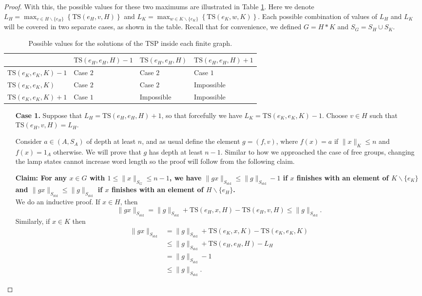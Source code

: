\documentclass[reqno,oneside]{amsart}
\newcommand{\std}{S_{\mathrm{std}}}
\newcommand{\TS}[3]{\mathrm{TS}\left(#1,#2,#3\right)}
\theoremstyle{plain}
\theoremstyle{definition}
\begin{document}
\begin{proof}
	With this, the possible values for these two maximums are illustrated in Table \ref{table: possible values TS free products}. Here we denote $L_H= \max_{v\in H\backslash\{e_H\}}\left\{\TS{e_H}{v}{H}\right\}$ and $L_K= \max_{w\in K\backslash\{e_K\}}\left\{\TS{e_K}{w}{K}\right\}$. Each possible combination of values of $L_H$ and $L_K$ will be covered in two separate cases, as shown in the table. Recall that for convenience, we defined $G=H*K$ and $S_G=S_H\cup S_K.$
	\begin{table}[h!]
		\centering
		\begin{tabular}{|l|l|l|l|}
			\hline
			\diagbox[width=3.5cm]{$L_K$}{$L_H$}& $\TS{e_H}{e_H}{H}-1$ & $\TS{e_H}{e_H}{H}$ & $\TS{e_H}{e_H}{H}+1$ \\ \hline
			$\TS{e_K}{e_K}{K}-1$ &           Case $2$           &     Case $2$               &           Case $1$           \\ \hline
			$\TS{e_K}{e_K}{K}$   &           Case $2$           &      Case $2$              &            Impossible          \\ \hline
			$\TS{e_K}{e_K}{K}+1$ &          Case $1$            &          Impossible          &    Impossible                  \\ \hline
		\end{tabular}
		\caption{Possible values for the solutions of the TSP inside each finite graph.}
		\label{table: possible values TS free products}
	\end{table}
	
	\begin{itemize}
		\item[\textbf{Case 1.}] Suppose that $L_H=\TS{e_H}{e_H}{H}+1$, so that forcefully we have $L_K= \TS{e_K}{e_K}{K}-1$. Choose $v\in H$ such that $\TS{e_H}{v}{H}=L_H$.
		
		Consider $a\in (A,S_A)$ of depth at least $n$, and as usual define the element $g=(f,v)$, where $f(x)=a$ if $\|x\|_K\le n$ and $f(x)=1_A$ otherwise. We will prove that $g$ has depth at least $n-1$. Similar to how we approached the case of free groups, changing the lamp states cannot increase word length so the proof will follow from the following claim.
		
		
		\textbf{Claim: For any $x\in G$ with $1\le \|x\|_{S_G}\le n-1$, we have $\|gx\|_{\std}\le \|g\|_{\std}-1$ if $x$ finishes with an element of $K\backslash\{e_K\}$ and $\|gx\|_{\std}\le \|g\|_{\std}$ if $x$ finishes with an element of $H\backslash\{e_H\}$.}\\
		We do an inductive proof.
		If $x\in H$, then 
		\begin{equation*}
		\|gx\|_{\std}=\|g\|_{\std}+\TS{e_H}{x}{H}-\TS{e_H}{v}{H}\le \|g\|_{\std}.
		\end{equation*}
		Similarly, if $x\in K$ then 
		\begin{align*}
		\|gx\|_{\std}&=\|g\|_{\std}+\TS{e_K}{x}{K}-\TS{e_K}{e_K}{K}\\&\le \|g\|_{\std}+\TS{e_H}{e_H}{H}-L_H\\ &= \|g\|_{\std}-1\\&\le \|g\|_{\std}.
		\end{align*}	
		

\end{itemize}
\end{proof}
\end{document}
